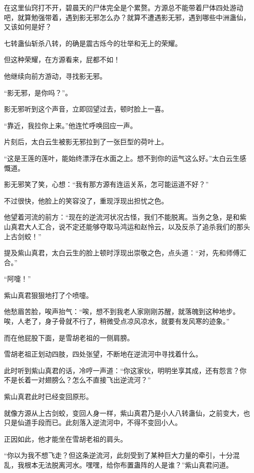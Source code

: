 \begin{this_body}
在这里仙窍打不开，碧晨天的尸体完全是个累赘。方源总不能带着尸体四处游动吧，就算勉强带着，遇到影无邪怎么办？就算不遭遇影无邪，遇到哪些中洲蛊仙，又该如何是好？

七转蛊仙斩杀八转，的确是震古烁今的壮举和无上的荣耀。

但这种荣耀，在方源看来，屁都不如！

他继续向前方游动，寻找影无邪。

“影无邪，是你吗？”。

影无邪听到这个声音，立即回望过去，顿时脸上一喜。

“靠近，我拉你上来。”他连忙呼唤回应一声。

片刻后，太白云生被影无邪拉到了一张巨型的荷叶上。

“这是王莲的莲叶，能始终漂浮在水面之上。想不到你的运气这么好。”太白云生感慨道。

影无邪笑了笑，心想：“我有那方源有连运关系，怎可能运道不好？”

不过很快，他脸上的笑容没了，重现浮现出担忧之色。

他望着河流的前方：“现在的逆流河状况古怪，我们不能脱离。当务之急，是和紫山真君大人汇合，说不定还能够夺取马鸿运和赵怜云，以及反杀了追杀我们的那头上古剑蛟！”

提及紫山真君，太白云生的脸上顿时浮现出崇敬之色，点头道：“对，先和师傅汇合。”

“阿嚏！”

紫山真君狠狠地打了个喷嚏。

他愁眉苦脸，唉声抬气：“唉，想不到我老人家刚刚苏醒，就落魄到这种地步。唉，人老了，身子骨就不行了，稍微受点凉风凉水，就要有发风寒的迹象。”

而在他屁股下面，是雪胡老祖的一侧肩膀。

雪胡老祖正划动四肢，四处张望，不断地在逆流河中寻找着什么。

此时听到紫山真君的话，冷哼一声道：“你这家伙，明明坐享其成，还有怨言？你不是长着一对翅膀么？怎么不直接飞出逆流河？”

紫山真君此时已经变回原形。

就像方源从上古剑蛟，变回人身一样，紫山真君乃是小人八转蛊仙，之前变大，也只是仙道手段而已。此刻落入逆流河中，不得不变回小人。

正因如此，他才能坐在雪胡老祖的肩头。

“你以为我不想飞走？但这条逆流河，此刻受到了某种巨大力量的牵引，十分混乱，我根本无法脱离河水。嘿嘿，给你布置蛊阵的人是谁？”紫山真君问道。


\end{this_body}
